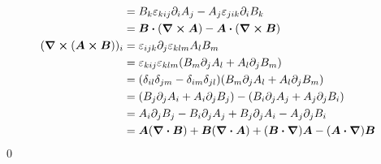 \documentclass[uplatex,dvipdfmx,a4paper,11pt]{jlreq}
\makeatletter
\newcommand{\rot}{\curl}
\theoremstyle{definition}
\renewenvironment{proof}[1][\proofname]{\par
  \normalfont
  \topsep6\p@\@plus6\p@ \trivlist
  \item[\hskip\labelsep{\bfseries #1}\@addpunct{\bfseries}]\ignorespaces\quad\par
}{%
  \qed\endtrivlist\@endpefalse
}
\renewcommand\proofname{証明}
\makeatother
\begin{document}
\begin{proof}
\begin{align}
                                   & = B_k\varepsilon_{kij}\partial_iA_j - A_j\varepsilon_{jik}\partial_iB_k                                                                         \\
                                   & = \bm{B}\vdot(\rot{\bm{A}}) - \bm{A}\vdot(\rot{\bm{B}})                                                                                         \\
    (\rot{(\bm{A}\cross\bm{B})})_i & = \varepsilon_{ijk}\partial_j\varepsilon_{klm}A_lB_m                                                                                            \\
                                   & = \varepsilon_{kij}\varepsilon_{klm}(B_m\partial_jA_l + A_l\partial_jB_m)                                                                       \\
                                   & = (\delta_{il}\delta_{jm} - \delta_{im}\delta_{jl})(B_m\partial_jA_l + A_l\partial_jB_m)                                                        \\
                                   & = (B_j\partial_jA_i + A_i\partial_jB_j) - (B_i\partial_jA_j + A_j\partial_jB_i)                                                                 \\
                                   & = A_i\partial_jB_j - B_i\partial_jA_j + B_j\partial_jA_i - A_j\partial_jB_i                                                                     \\
                                   & = \bm{A}(\div{\bm{B}}) + \bm{B}(\div{\bm{A}}) + (\bm{B}\vdot\vnabla)\bm{A} - (\bm{A}\vdot\vnabla)\bm{B}
  \end{align}
\end{proof}
\end{document}
